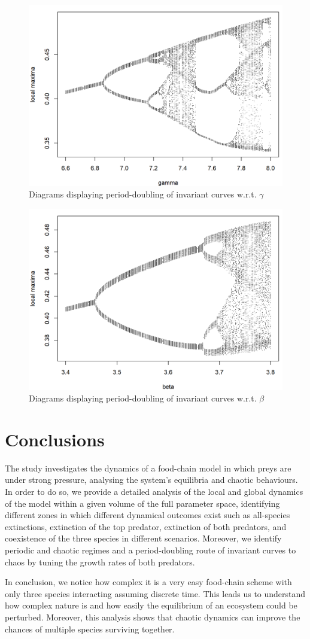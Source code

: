 \documentclass[10pt]{Configuration_Files/PoliMi3i_thesis}
\begin{document}
\begin{figure}[!h]
\centering
   \includegraphics[width=0.6\linewidth]{images/Chapter 6.3/unnamed-chunk-11-1.png} 
  \caption{Diagrams displaying period-doubling of invariant curves w.r.t. $\gamma$}
  \label{fig:Bif_diag_gamma}
\end{figure}

\begin{figure}[!h]
\centering
   \includegraphics[width=0.6\linewidth]{images/Chapter 6.3/unnamed-chunk-12-1.png}
   \caption{Diagrams displaying period-doubling of invariant curves w.r.t. $\beta$}
   \label{fig:Bif_diag_beta}
\end{figure}

\chapter{Conclusions}
The study investigates the dynamics of a food-chain model in which preys are under strong pressure, analysing the system's equilibria and chaotic behaviours. In order to do so, we provide a detailed analysis of the local and global dynamics of the model within a given volume of the full parameter space, identifying different zones in which different dynamical outcomes exist such as all-species extinctions, extinction of the top predator, extinction of both predators, and coexistence of the three species in different scenarios. Moreover, we identify periodic and chaotic regimes and a period-doubling route of invariant curves to chaos by tuning the growth rates of both predators. 

In conclusion, we notice how complex it is a very easy food-chain scheme with only three species interacting assuming discrete time. This leads us to understand how complex nature is and how easily the equilibrium of an ecosystem could be perturbed. Moreover, this analysis shows that chaotic dynamics can improve the chances of multiple species surviving together.
\end{document}
